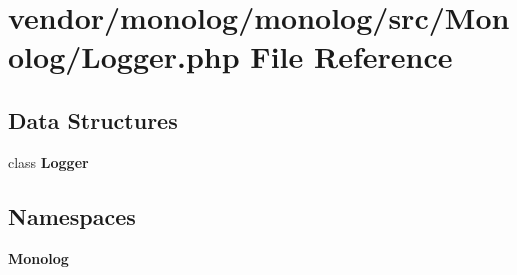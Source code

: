 \section{vendor/monolog/monolog/src/\+Monolog/\+Logger.php File Reference}
\label{monolog_2monolog_2src_2_monolog_2_logger_8php}
\subsection*{Data Structures}
\begin{DoxyCompactItemize}
\item 
class {\bf Logger}
\end{DoxyCompactItemize}
\subsection*{Namespaces}
\begin{DoxyCompactItemize}
\item 
 {\bf Monolog}
\end{DoxyCompactItemize}
